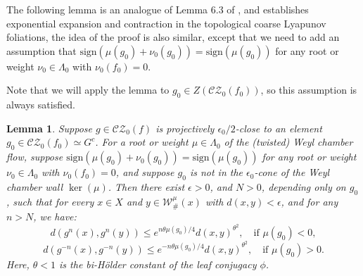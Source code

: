 \documentclass[11pt]{amsart}
\numberwithin{equation}{section}
\newcommand{\W}{\mathcal{W}}
\newcommand{\CZ}{\mathcal{CZ}}
\theoremstyle{plain}
\newtheorem{lem}[thm]{Lemma}
\begin{document}
The following lemma is an analogue of Lemma 6.3 of  \cite{Wang}, and establishes exponential expansion and contraction in the topological coarse Lyapunov foliations, the idea of the proof is also similar, except that we need to add an assumption that $\mathrm{sign}(\mu(g_0) + \nu_0(g_0)) = \mathrm{sign}(\mu(g_0))$ for any root or weight $\nu_0\in \Lambda_0$ with $\nu_0(f_0) = 0$.

Note that we will apply the lemma to $g_0\in Z(\CZ_0(f_0))$, so this assumption is always satisfied.

\begin{lem}\label{gcontr}
    Suppose $g \in \CZ_0(f)$ is projectively $\epsilon_0/2$-close to an element $g_0 \in \CZ_0(f_0) \simeq G^c$. For a root or weight $\mu\in \Lambda_0$ of the (twisted) Weyl chamber flow, suppose $\mathrm{sign}(\mu(g_0) + \nu_0(g_0)) = \mathrm{sign}(\mu(g_0))$ for any root or weight $\nu_0\in \Lambda_0$ with $\nu_0(f_0) = 0$, and suppose $g_0$ is not in the $\epsilon_0$-cone of the Weyl chamber wall $\ker(\mu)$. Then there exist $\epsilon > 0$, and $N > 0$, depending only on $g_0$, such that for every $x \in X$ and $y \in \W^\mu_\#(x)$ with $d(x,y) < \epsilon$, and for any $n > N$, we have:
    \[
    d(g^n(x), g^n(y)) \le e^{n \theta \mu(g_0)/4} d(x,y)^{\theta^2}, \quad \text{if } \mu(g_0) < 0,
    \]
    \[
    d(g^{-n}(x), g^{-n}(y)) \le e^{-n \theta \mu(g_0)/4} d(x,y)^{\theta^2}, \quad \text{if } \mu(g_0) > 0.
    \]
    Here, $\theta < 1$ is the bi-Hölder constant of the leaf conjugacy $\phi$.
\end{lem}
\end{document}
